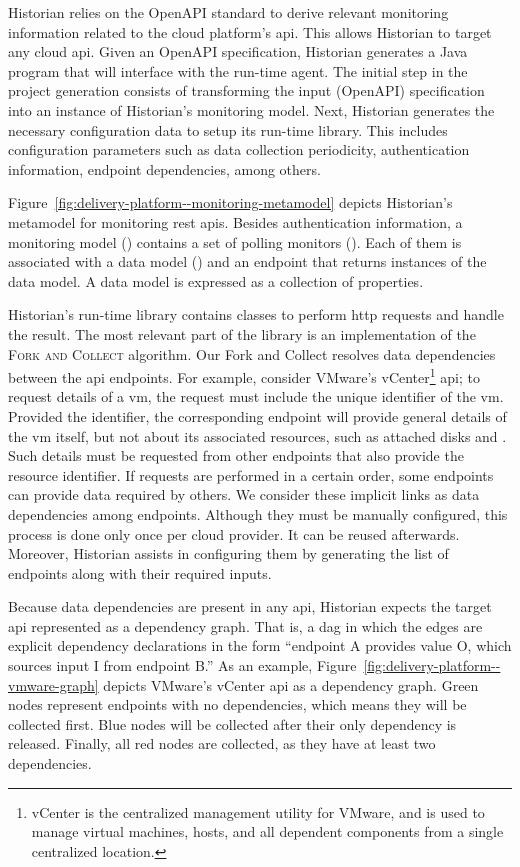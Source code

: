 Historian relies on the OpenAPI standard to derive relevant monitoring information related to the cloud platform's \gls{api}. This allows Historian to target any cloud \gls{api}. Given an OpenAPI specification, Historian generates a Java program that will interface with the run-time agent. The initial step in the project generation consists of transforming the input (OpenAPI) specification into an instance of Historian's monitoring model. Next, Historian generates the necessary configuration data to setup its run-time library. This includes configuration parameters such as data collection periodicity, authentication information, endpoint dependencies, among others.

Figure~\ref{fig:delivery-platform--monitoring-metamodel} depicts Historian's metamodel for monitoring \gls{rest} \glspl{api}. Besides authentication information, a monitoring model () contains a set of polling monitors (). Each of them is associated with a data model () and an endpoint that returns instances of the data model. A data model is expressed as a collection of properties.

Historian's run-time library contains classes to perform \acrshort{http} requests and handle the result. The most relevant part of the library is an implementation of the \textsc{Fork and Collect} algorithm. Our Fork and Collect resolves data dependencies between the \gls{api} endpoints. For example, consider VMware's vCenter\footnote{vCenter is the centralized management utility for VMware, and is used to manage virtual machines, hosts, and all dependent components from a single centralized location.} \gls{api}; to request details of a \gls{vm}, the request must include the unique identifier of the \gls{vm}. Provided the identifier, the corresponding endpoint will provide general details of the \gls{vm} itself, but not about its associated  resources, such as attached disks and . Such details must be requested from other endpoints that also provide the resource identifier. If requests are performed in a certain order, some endpoints can provide data required by others. We consider these implicit links as data dependencies among endpoints. Although they must be manually configured, this process is done only once per cloud provider. It can be reused afterwards. Moreover, Historian assists in configuring them by generating the list of endpoints along with their required inputs.

Because data dependencies are present in any \gls{api}, Historian expects the target \gls{api} represented as a dependency graph. That is, a \gls{dag} in which the edges are explicit dependency declarations in the form ``endpoint A provides value O, which sources input I from endpoint B.'' As an example, Figure~\ref{fig:delivery-platform--vmware-graph} depicts VMware's vCenter \gls{api} as a dependency graph. Green nodes represent endpoints with no dependencies, which means they will be collected first. Blue nodes will be collected after their only dependency is released. Finally, all red nodes are collected, as they have at least two dependencies.

